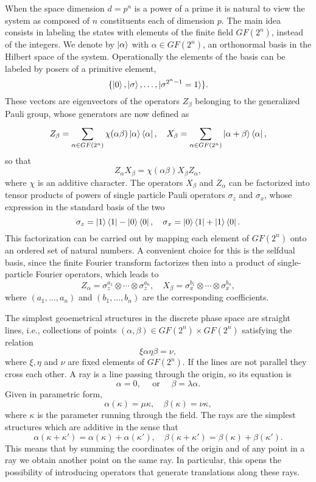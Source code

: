 \documentclass[a4paper]{article}
\begin{document}
  When the space dimension $d = p^{n}$ is a power of a prime
  it is natural to view the system as composed of $n$ 
  constituents each of dimension $p$. The main idea consists
  in labeling the states with elements of the finite field
  $GF(2^{n})$, instead of the integers. We denote by $\ket
  \alpha$ with $\alpha \in GF(2^{n})$, an orthonormal basis
  in the Hilbert space of the system. Operationally the
  elements of the basis can be labeled by posers of a
  primitive element,
  \[
    \{\ket 0, \ket \sigma, \ldots,
    \ket{\sigma^{2^{n}-1}=1}\}.
  \] 
  These vectors are eigenvectors of the operators $Z_\beta$ 
  belonging to the generalized Pauli group, whose generators
  are now defined as
  \[
    Z_\beta = \sum_{\alpha \in GF(2^{n})}^{} \chi(\alpha
    \beta) \ket \alpha \bra \alpha,
    \quad
    X_\beta = \sum_{\alpha \in GF(2^{n})}^{} \ket{\alpha +
      \beta} \bra \alpha,
  \] 
  so that
  \[
    Z_\alpha X_\beta = \chi(\alpha\beta) X_\beta Z_\alpha,
  \] 
  where $\chi$ is an additive character. The operators
  $X_\beta$ and $Z_\alpha$ can be factorized into tensor
  products of powers of single particle Pauli operators
  $\sigma_z$ and $\sigma_x$, whose expression in the
  standard basis of the two 
  \[
    \sigma_z = \ket 1 \bra 1 - \ket 0 \bra 0,
    \quad
    \sigma_x = \ket 0 \bra 1 + \ket 1 \bra 0.
  \] 
  This factorization can be carried out by mapping each
  element of $GF(2^{n})$ onto an ordered set of natural
  numbers. A convenient choice for this is the selfdual
  basis, since the finite Fourier transform factorizes then
  into a product of single-particle Fourier operators, which
  leads to
  \[
    Z_\alpha = \sigma_z^{a_1} \otimes \cdots \otimes
    \sigma_z^{a_n},
    \quad
    X_\beta = \sigma_x^{b_1} \otimes \cdots \otimes
    \sigma_x^{b_n},
  \] 
  where $(a_1,\ldots,a_n)$ and $(b_1,\ldots,b_n)$ are the
  corresponding coefficients.

  The simplest geoemetrical structures in the discrete phase
  space are straight lines, i.e., collections of points
  $(\alpha,\beta) \in GF(2^{n}) \times GF(2^{n})$ satisfying
  the relation
  \[
    \xi \alpha \eta \beta = \nu,
  \] 
  where $\xi, \eta$ and $\nu$ are fixed elements of
  $GF(2^{n})$. If the lines are not parallel they cross each
  other. A ray is a line passing through the origin, so its
  equation is
  \[
    \alpha = 0,
    \quad 
    \text{ or }
    \quad 
    \beta = \lambda \alpha.
  \] 
  Given in parametric form,
  \[
    \alpha(\kappa) = \mu \kappa,
    \quad
    \beta(\kappa) = \nu \kappa,
  \] 
  where $\kappa$ is the parameter running through the field.
  The rays are the simplest structures which are additive in
  the sense that
  \[
    \alpha(\kappa + \kappa') = \alpha(\kappa) +
    \alpha(\kappa'),
    \quad
    \beta(\kappa + \kappa') = \beta(\kappa) +
    \beta(\kappa').
  \] 
  This means that by summing the coordinates of the origin
  and of any point in a ray we obtain another point on the
  same ray. In particular, this opens the possibility of
  introducing operators that generate translations along
  these rays.
\end{document}
